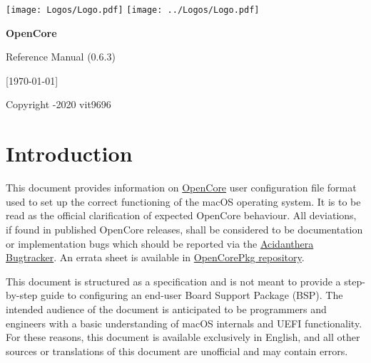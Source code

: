 \documentclass[]{article}
\begin{document}
\begin{titlepage}
   \begin{center}
       \vspace*{2.0in}

       \Huge

         {\texttt{[image: Logos/Logo.pdf]}}
         {\texttt{[image: ../Logos/Logo.pdf]}}

       \sffamily

       \textbf{OpenCore}

       \vspace{0.2in}

       Reference Manual (0.6.3)

       \vspace{0.2in}

        {[}\today{]}

       \normalsize

       \vfill

       \rmfamily

       Copyright -2020 vit9696

   \end{center}
\end{titlepage}

\tableofcontents

\section{Introduction}\label{introduction}

This document provides information on
\href{https://github.com/acidanthera/OpenCorePkg}{OpenCore} user
configuration file format used to set up the correct functioning of the macOS
operating system. It is to be read as the official clarification of expected
OpenCore behaviour. All deviations, if found in published OpenCore releases,
shall be considered to be documentation or implementation bugs which should be
reported via the \href{https://github.com/acidanthera/bugtracker}{Acidanthera Bugtracker}.
An errata sheet is available in
\href{https://github.com/acidanthera/OpenCorePkg/blob/master/Docs/Errata/Errata.pdf}{OpenCorePkg repository}.

This document is structured as a specification and is not meant to provide a step-by-step
guide to configuring an end-user Board Support Package (BSP). The intended audience
of the document is anticipated to be programmers and engineers with a basic understanding of macOS internals
and UEFI functionality. For these reasons, this document is available exclusively in English,
and all other sources or translations of this document are unofficial and may
contain errors.
\end{document}
